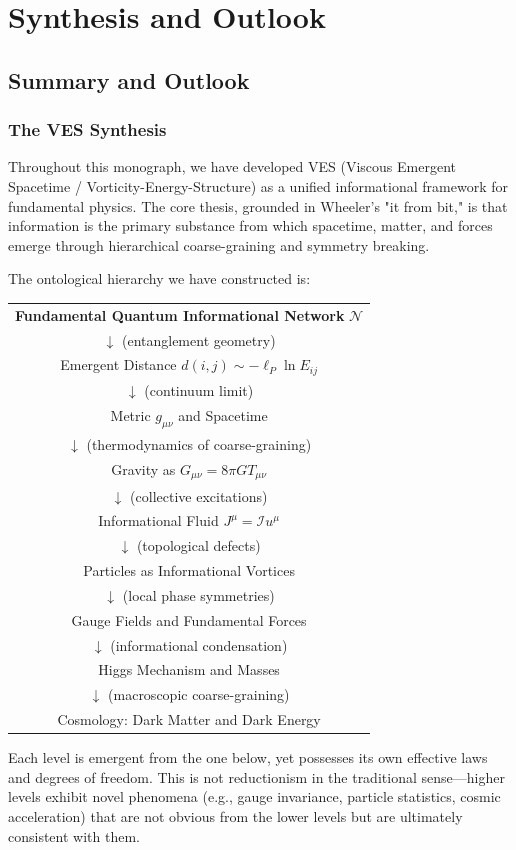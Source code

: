 \documentclass[12pt,a4paper]{book}
\newcommand{\I}{\mathcal{I}}
\begin{document}
\part{Synthesis and Outlook}

\chapter{Summary and Outlook}

\section{The VES Synthesis}

Throughout this monograph, we have developed VES (Viscous Emergent Spacetime / Vorticity-Energy-Structure) as a unified informational framework for fundamental physics. The core thesis, grounded in Wheeler's "it from bit," is that information is the primary substance from which spacetime, matter, and forces emerge through hierarchical coarse-graining and symmetry breaking.

The ontological hierarchy we have constructed is:
\begin{center}
\begin{tabular}{c}
\textbf{Fundamental Quantum Informational Network} $\mathcal{N}$ \\
$\downarrow$ (entanglement geometry) \\
Emergent Distance $d(i,j) \sim -\ell_P \ln E_{ij}$ \\
$\downarrow$ (continuum limit) \\
Metric $g_{\mu\nu}$ and Spacetime \\
$\downarrow$ (thermodynamics of coarse-graining) \\
Gravity as $G_{\mu\nu} = 8\pi G T_{\mu\nu}$ \\
$\downarrow$ (collective excitations) \\
Informational Fluid $J^\mu = \I u^\mu$ \\
$\downarrow$ (topological defects) \\
Particles as Informational Vortices \\
$\downarrow$ (local phase symmetries) \\
Gauge Fields and Fundamental Forces \\
$\downarrow$ (informational condensation) \\
Higgs Mechanism and Masses \\
$\downarrow$ (macroscopic coarse-graining) \\
Cosmology: Dark Matter and Dark Energy
\end{tabular}
\end{center}
Each level is emergent from the one below, yet possesses its own effective laws and degrees of freedom. This is not reductionism in the traditional sense—higher levels exhibit novel phenomena (e.g., gauge invariance, particle statistics, cosmic acceleration) that are not obvious from the lower levels but are ultimately consistent with them.
\end{document}
